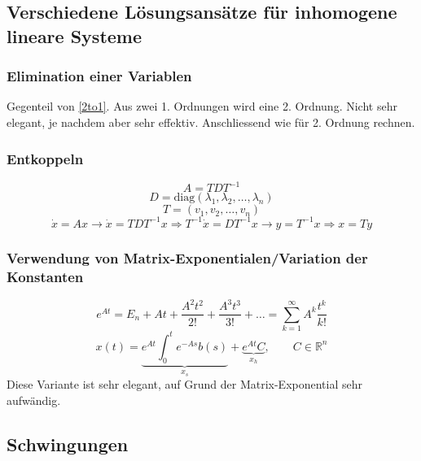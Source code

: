 \subsection{Verschiedene Lösungsansätze für inhomogene lineare Systeme }
\subsubsection{Elimination einer Variablen}

Gegenteil von \ref{2to1}. Aus zwei 1. Ordnungen wird eine 2. Ordnung. Nicht sehr elegant, je nachdem aber sehr effektiv. Anschliessend wie für 2. Ordnung rechnen.

\subsubsection{Entkoppeln}
\begin{equation*}
	A = TDT^{-1} 
\end{equation*}
\begin{equation*}
	D = \mathrm{diag}(\lambda_1, \lambda_2, \dots, \lambda_n)
\end{equation*}
\begin{equation*}
	T = (v_1, v_2, \dots, v_n)
\end{equation*}
\begin{equation*}
	\dot{x} = Ax \rightarrow \dot{x} = TDT^{-1}x \Rightarrow T^{-1}\dot{x} = DT^{-1}x \rightarrow y = T^{-1}x \Rightarrow x = Ty
\end{equation*}

\subsubsection{Verwendung von Matrix-Exponentialen/Variation der Konstanten}
\begin{equation*}
	e^{At} = E_n + At + \frac{A^2t^2}{2!} + \frac{A^3t^3}{3!} + \dots = \sum_{k = 1}^{\infty} A^k \frac{t^k}{k!}
\end{equation*}
\begin{equation*}
	x(t) = \underbrace{e^{At} \int_{0}^{t} e^{-As}b(s)}_{x_s} + \underbrace{e^{At}C}_{x_h}, \qquad C \in \mathbb{R}^n
\end{equation*}
Diese Variante ist sehr elegant, auf Grund der Matrix-Exponential sehr aufwändig.
\subsection{Schwingungen}

